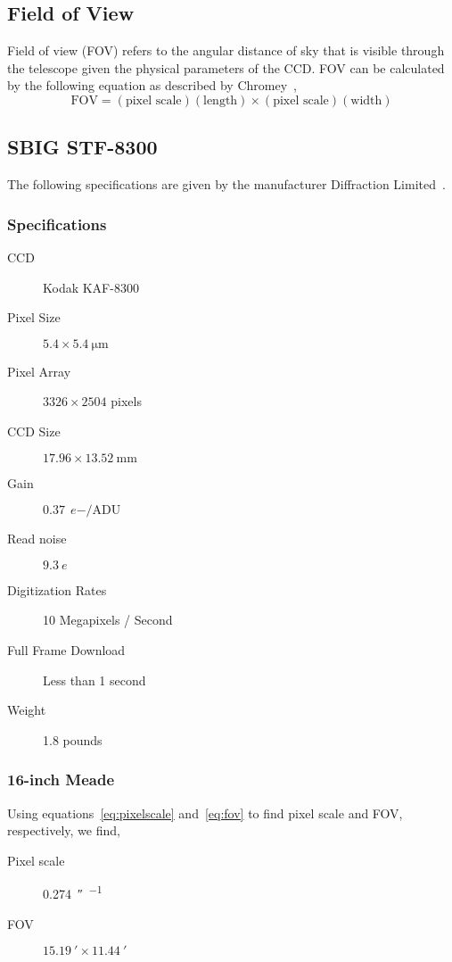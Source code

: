 \subsection{Field of View}
Field of view (FOV) refers to the angular distance of sky that is visible through the telescope given the physical parameters of the CCD\@.
FOV can be calculated by the following equation as described by Chromey~\cite{chromey_2010},
\begin{equation}
    \text{FOV} = (\text{pixel scale})(\text{length}) \times (\text{pixel scale})(\text{width})
    \label{eq:fov}
\end{equation}

\subsection{SBIG STF-8300}
The following specifications are given by the manufacturer Diffraction Limited~\cite{sbig}.
\subsubsection{Specifications}
\begin{description}
    \item[CCD] Kodak KAF-8300
    \item[Pixel Size] $5.4 \times \SI{5.4}{\micro\meter}$
    \item[Pixel Array] $3326 \times 2504$ pixels
    \item[CCD Size] $17.96 \times \SI{13.52}{\milli\meter}$
    \item[Gain] $\SI{0.37}{\elementarycharge-\per\text{ADU}}$
    \item[Read noise] $\SI{9.3}{\elementarycharge}$
    \item[Digitization Rates] 10 Megapixels / Second
    \item[Full Frame Download] Less than 1 second
    \item[Weight] 1.8 pounds
\end{description}

\subsubsection{16-inch Meade}
Using equations~\ref{eq:pixelscale} and~\ref{eq:fov} to find pixel scale and FOV, respectively, we find, 
\begin{description}
    \item[Pixel scale] \SI{0.274}{\arcsecond\per{}}
    \item[FOV] $\SI{15.19}{\arcminute} \times \SI{11.44}{\arcminute}$
\end{description}

